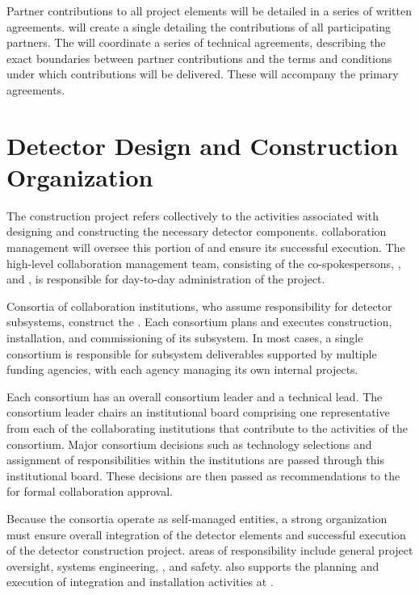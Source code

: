 Partner contributions to all project elements will be detailed 
in a series of written agreements.   will create a single  
detailing the contributions of all participating partners.  
 The   will coordinate a series of technical agreements, describing the exact 
boundaries between partner contributions and the terms and 
conditions under which contributions will be delivered. These will accompany
 the primary agreements.   

\section{Detector Design and Construction Organization}
\label{sec:es-tc-det-const}

The   construction project refers collectively 
to the activities associated with designing and constructing the
necessary detector components.   collaboration management 
will oversee this portion of  and 
ensure its successful execution.  The high-level  
collaboration management team, consisting of the co-spokespersons, 
, and , is responsible for day-to-day 
administration of the project.  

Consortia of collaboration institutions, who assume responsibility 
for detector subsystems, construct the  . Each consortium plans and executes 
construction, installation, and commissioning of its subsystem.  In most cases, a single consortium is responsible for subsystem deliverables supported by 
multiple funding agencies, with each agency managing its own internal projects. 

Each consortium has an overall consortium leader 
and a technical lead.  The consortium leader chairs an institutional 
board comprising one representative from each of the collaborating 
institutions that contribute to the activities of the consortium.  Major 
consortium decisions such as technology selections and assignment of 
responsibilities within the institutions are passed through this institutional 
board.  These decisions are then passed as recommendations to 
the   for formal collaboration approval.

Because the consortia operate as self-managed entities, a strong
 organization must ensure overall integration 
of the detector elements and successful execution of the detector
construction project.   areas of responsibility include 
general project oversight, systems engineering, , and 
safety.   also supports the planning and execution 
of integration and installation activities at .  

